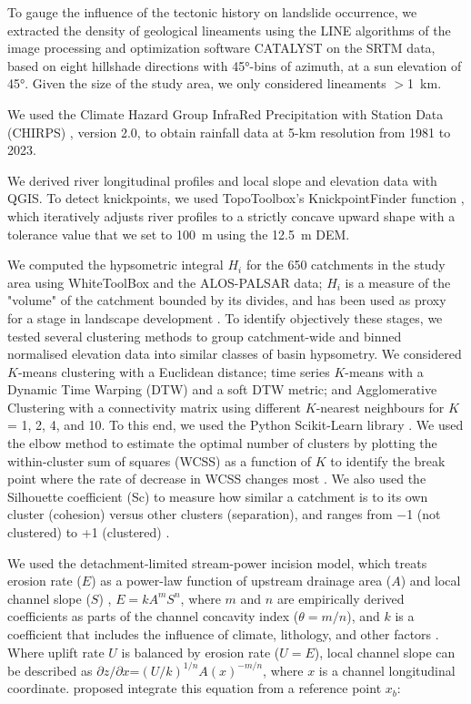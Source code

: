 \documentclass[draft]{agujournal2019}
\begin{document}
\par To gauge the influence of the tectonic history on landslide occurrence, we extracted the density of geological lineaments using the LINE algorithms of the image processing and optimization software CATALYST on the SRTM data, based on eight hillshade directions with 45°-bins of azimuth, at a sun elevation of 45°. Given the size of the study area, we only considered lineaments $>$1~km.  

\par We used the Climate Hazard Group InfraRed Precipitation with Station Data (CHIRPS) \cite{funk2015}, version 2.0, to obtain rainfall data at 5-km resolution from 1981 to 2023. 

\par We derived river longitudinal profiles and local slope and elevation data with QGIS. To detect knickpoints, we used TopoToolbox's KnickpointFinder function \cite{Schwanghart_2014}, which iteratively adjusts river profiles to a strictly concave upward shape with a tolerance value that we set to 100~m using the 12.5~m DEM. 

\par We computed the hypsometric integral $H_i$ for the 650 catchments in the study area using WhiteToolBox \cite{lindasy2014} and the ALOS-PALSAR data; $H_i$ is a measure of the "volume" of the catchment bounded by its divides, and has been used as proxy for a stage in landscape development \cite{Strahler1952, Gallen2011}. To identify objectively these stages, we tested several clustering methods to group catchment-wide and binned normalised elevation data into similar classes of basin hypsometry. We considered $K$-means clustering with a Euclidean distance; time series $K$-means with a Dynamic Time Warping (DTW) and a soft DTW metric; and Agglomerative Clustering with a connectivity matrix using different $K$-nearest neighbours for $K$ = 1, 2, 4, and 10. To this end, we used the Python Scikit-Learn library \cite{scikit-learn2011}. We used the elbow method to estimate the optimal number of clusters by plotting the within-cluster sum of squares (WCSS) as a function of $K$ to identify the break point where the rate of decrease in WCSS changes most \cite{thorndike1953}. We also used the Silhouette coefficient (Sc) to measure how similar a catchment is to its own cluster (cohesion) versus other clusters (separation), and ranges from $-$1 (not clustered) to +1 (clustered) \cite{rousseeuw1987}. 

\par We used the detachment-limited stream-power incision model, which treats erosion rate ($E$) as a power-law function of upstream drainage area ($A$) and local channel slope ($S$) \cite{Howard1983, Whipple1999}, $E=kA^mS^n$, where $m$ and $n$ are empirically derived coefficients as parts of the channel concavity index ($\theta=m/n$), and $k$ is a coefficient that includes the influence of climate, lithology, and other factors \cite{Whipple1999}. Where uplift rate $U$ is balanced by erosion rate ($U=E$), local channel slope can be described as $\partial z/\partial x$=$(U/k)^{1/n}A(x)^{-m/n}$, where $x$ is a channel longitudinal coordinate.  proposed integrate this equation from a reference point $x_b$:  
\end{document}

